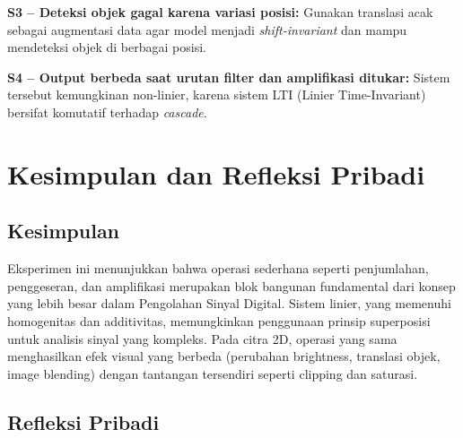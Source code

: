 \documentclass[12pt,a4paper]{article}
\begin{document}
\textbf{S3 -- Deteksi objek gagal karena variasi posisi:} Gunakan translasi acak sebagai augmentasi data agar model menjadi \textit{shift-invariant} dan mampu mendeteksi objek di berbagai posisi.

\textbf{S4 -- Output berbeda saat urutan filter dan amplifikasi ditukar:} Sistem tersebut kemungkinan non-linier, karena sistem LTI (Linier Time-Invariant) bersifat komutatif terhadap \textit{cascade}.

\section{Kesimpulan dan Refleksi Pribadi}

\subsection{Kesimpulan}

Eksperimen ini menunjukkan bahwa operasi sederhana seperti penjumlahan, penggeseran, dan amplifikasi merupakan blok bangunan fundamental dari konsep yang lebih besar dalam Pengolahan Sinyal Digital. Sistem linier, yang memenuhi homogenitas dan additivitas, memungkinkan penggunaan prinsip superposisi untuk analisis sinyal yang kompleks. Pada citra 2D, operasi yang sama menghasilkan efek visual yang berbeda (perubahan brightness, translasi objek, image blending) dengan tantangan tersendiri seperti clipping dan saturasi.

\subsection{Refleksi Pribadi}
\end{document}
